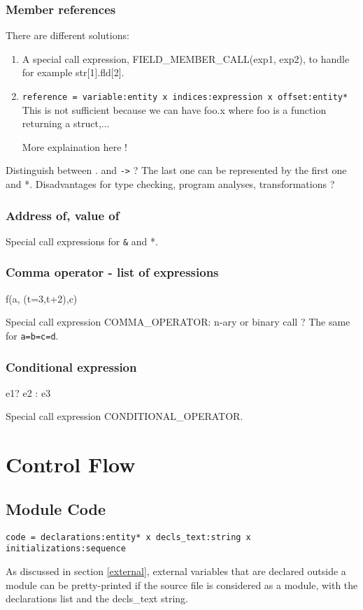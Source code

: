 \documentclass[a4paper]{article}
\begin{document}
\subsubsection{Member references }

There are different solutions:
\begin{enumerate}
\item A special call expression, FIELD\_MEMBER\_CALL(exp1, exp2), to handle for example
str[1].fld[2]. 
\item \verb/reference = variable:entity x indices:expression x offset:entity*/ 
This is not sufficient because we can have foo.x where foo is a function
returning a struct,... 

More explaination here !
\end{enumerate}
 Distinguish between . and \verb/->/ ? The last one can be represented by
 the first one and *. 
 Disadvantages for type checking, program
analyses, transformations ?

\subsubsection{Address of, value of}
Special call expressions for \verb/&/ and *.

\subsubsection{Comma operator - list of expressions}
f(a, (t=3,t+2),c)

Special call expression COMMA\_OPERATOR: n-ary or binary call ?
The same for \verb/a=b=c=d/. 

\subsubsection{Conditional expression}
e1? e2 : e3 

Special call expression CONDITIONAL\_OPERATOR.

\newpage
\section{Control Flow}
\subsection{Module Code}
\verb/code = declarations:entity* x decls_text:string x initializations:sequence/

As discussed in section \ref{external}, external variables that are
declared outside a module can be pretty-printed if the source file is
considered as a module, with the declarations list and the decls\_text string. 
\end{document}
